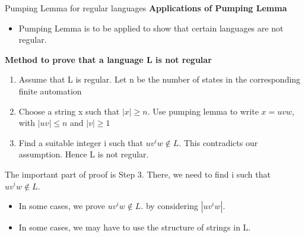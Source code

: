 \documentclass{beamer}
\begin{document}
\begin{frame}{Pumping Lemma for regular languages }
\textbf{Applications of Pumping Lemma}
\begin{itemize}
	\item Pumping Lemma is to be applied to show that certain languages are not regular.
\end{itemize}
\textbf{Method to prove that a language L is not regular}
\begin{enumerate}
	\item Assume that L is regular. Let n be the number of states in the corresponding finite automation
	\item Choose a string x such that $|x| \geq n$. Use pumping lemma to write $x = uvw$, with $|uv| \leq n$ and $|v| \geq 1$
	\item Find a suitable integer i such that $uv^iw \notin L.$ This contradicts our assumption. Hence L is not regular.
\end{enumerate}
The important part of proof is Step 3. There, we need to find i such that $uv^iw \notin L.$ 
\begin{itemize}
	\item In some cases, we prove $uv^iw \notin L.$ by considering $|uv^iw|$.
	\item In some cases, we may have to use the structure of strings in L.
\end{itemize}
\end{frame}
\end{document}
